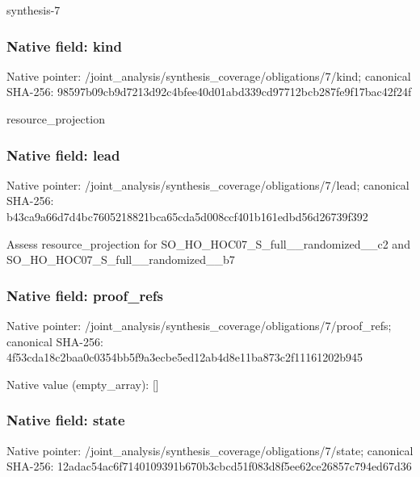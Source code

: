 \documentclass[10pt,a4paper]{article}
\begin{document}
\begingroup\raggedright\sloppy synthesis-7\par\endgroup

\subsubsection{Native field: kind}
Native pointer: /joint\_\allowbreak{}analysis/synthesis\_\allowbreak{}coverage/obligations/7/kind; canonical SHA-256: 98597b09cb9d7213d92c4bfee40d01abd339cd97712bcb287fe9f17bac42f24f

\begingroup\raggedright\sloppy resource\_\allowbreak{}projection\par\endgroup

\subsubsection{Native field: lead}
Native pointer: /joint\_\allowbreak{}analysis/synthesis\_\allowbreak{}coverage/obligations/7/lead; canonical SHA-256: b43ca9a66d7d4bc7605218821bca65cda5d008ccf401b161edbd56d26739f392

\begingroup\raggedright\sloppy Assess resource\_\allowbreak{}projection for SO\_\allowbreak{}HO\_\allowbreak{}HOC07\_\allowbreak{}S\_\allowbreak{}full\_\allowbreak{}\_\allowbreak{}randomized\_\allowbreak{}\_\allowbreak{}c2 and SO\_\allowbreak{}HO\_\allowbreak{}HOC07\_\allowbreak{}S\_\allowbreak{}full\_\allowbreak{}\_\allowbreak{}randomized\_\allowbreak{}\_\allowbreak{}b7\par\endgroup

\subsubsection{Native field: proof\_\allowbreak{}refs}
Native pointer: /joint\_\allowbreak{}analysis/synthesis\_\allowbreak{}coverage/obligations/7/proof\_\allowbreak{}refs; canonical SHA-256: 4f53cda18c2baa0c0354bb5f9a3ecbe5ed12ab4d8e11ba873c2f11161202b945

Native value (empty\_\allowbreak{}array): []

\subsubsection{Native field: state}
Native pointer: /joint\_\allowbreak{}analysis/synthesis\_\allowbreak{}coverage/obligations/7/state; canonical SHA-256: 12adac54ac6f7140109391b670b3cbcd51f083d8f5ee62ce26857c794ed67d36
\end{document}
